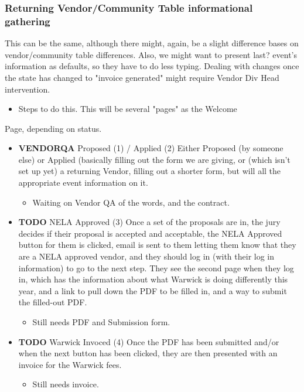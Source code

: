 \documentclass[captions=tablesignature]{scrartcl}
\begin{document}
\subsubsection{Returning Vendor/Community Table informational gathering}
\label{sec-3-1-5}
This can be the same, although there might, again, be a slight
difference bases on vendor/community table differences.  Also, we
might want to present last? event's information as defaults, so
they have to do less typing. Dealing with changes once the state
has changed to "invoice generated" might require Vendor Div Head
intervention.
\begin{itemize}
\item Steps to do this.  This will be several "pages" as the Welcome
\end{itemize}
Page, depending on status.
\begin{itemize}
\item {\bfseries\sffamily VENDORQA} Proposed (1) / Applied (2)
\label{sec-3-1-5-1}
Either Proposed (by someone else) or Applied (basically filling
out the form we are giving, or (which isn't set up yet) a
returning Vendor, filling out a shorter form, but will all the
appropriate event information on it.
\begin{itemize}
\item Waiting on Vendor QA of the words, and the contract.
\end{itemize}

\item {\bfseries\sffamily TODO} NELA Approved (3)
\label{sec-3-1-5-2}
Once a set of the proposals are in, the jury decides if their
proposal is accepted and acceptable, the NELA Approved button for
them is clicked, email is sent to them letting them know that
they are a NELA approved vendor, and they should log in (with
their log in information) to go to the next step.  They see the
second page when they log in, which has the information about
what Warwick is doing differently this year, and a link to pull
down the PDF to be filled in, and a way to submit the filled-out
PDF.
\begin{itemize}
\item Still needs PDF and Submission form.
\end{itemize}

\item {\bfseries\sffamily TODO} Warwick Invoced (4)
\label{sec-3-1-5-3}
Once the PDF has been submitted and/or when the next button has
been clicked, they are then presented with an invoice for the
Warwick fees.
\begin{itemize}
\item Still needs invoice.
\end{itemize}


\end{itemize}
\end{document}
